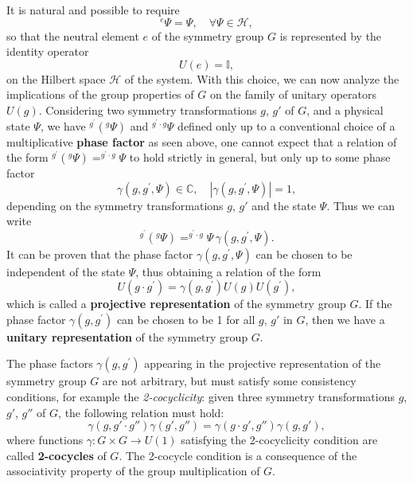 It is natural and possible to require
\[
    ^e \Psi = \Psi, \quad \forall \Psi \in \mathcal{H},
\]
so that the neutral element \(e\) of the symmetry group \(G\) is represented by the identity operator
\[
    U(e) = \mathbb{I},
\]
on the Hilbert space \(\mathcal{H}\) of the system. With this choice, we can now analyze the implications of the group properties of \(G\) on the family of unitary operators \(U(g)\). Considering two symmetry transformations \(g\), \(g'\) of \(G\), and a physical state \(\Psi\), we have \(^{g^{\prime}}(^g \Psi)\) and \(^{g^{\prime} \cdot g} \Psi\) defined only up to a conventional choice of a multiplicative \textbf{phase factor} as seen above, one cannot expect that a relation of the form \(^{g^{\prime}}(^g \Psi) = ^{g^{\prime} \cdot g} \Psi\) to hold strictly in general, but only up to some phase factor
\[
    \gamma(g, g^{\prime}, \Psi) \in \mathbb{C}, \quad |\gamma(g, g^{\prime}, \Psi)| = 1,
\]
depending on the symmetry transformations \(g\), \(g'\) and the state \(\Psi\). Thus we can write
\[
    ^{g^{\prime}}(^g \Psi) = ^{g^{\prime} \cdot g} \Psi \, \gamma(g, g^{\prime}, \Psi).
\]
It can be proven that the phase factor \(\gamma(g, g^{\prime}, \Psi)\) can be chosen to be independent of the state \(\Psi\), thus obtaining a relation of the form
\begin{equation}
    U(g \cdot g^{\prime}) = \gamma(g, g^{\prime}) U(g) U(g^{\prime}),
    \label{eq:projective_representation_symmetry_group_definition}
\end{equation}
which is called a \textbf{projective representation} of the symmetry group \(G\). If the phase factor \(\gamma(g, g^{\prime})\) can be chosen to be 1 for all \(g\), \(g'\) in \(G\), then we have a \textbf{unitary representation} of the symmetry group \(G\).

The phase factors \(\gamma(g, g^{\prime})\) appearing in the projective representation of the symmetry group \(G\) are not arbitrary, but must satisfy some consistency conditions, for example the \textit{2-cocyclicity}: given three symmetry transformations \(g\), \(g'\), \(g''\) of \(G\), the following relation must hold:
\begin{equation}
    \gamma(g, g' \cdot g'') \gamma(g', g'') = \gamma(g \cdot g', g'') \gamma(g, g'),
    \label{eq:2-cocyclicity_definition}
\end{equation}
where functions \(\gamma : G \times G \to U(1)\) satisfying the 2-cocyclicity condition are called \textbf{2-cocycles} of \(G\). The 2-cocycle condition is a consequence of the associativity property of the group multiplication of \(G\).

